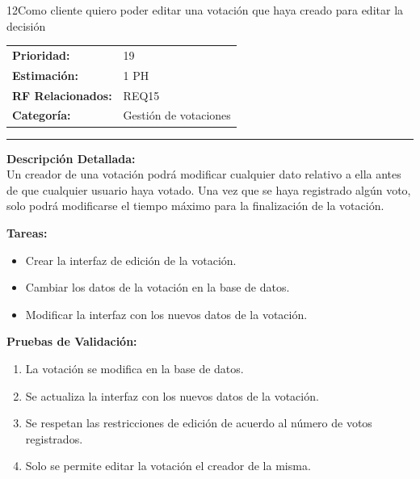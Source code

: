 \begin{hu_card}{12}{Como cliente quiero poder editar una votación que haya creado para editar la decisión}
    \begin{tabularx}{\linewidth}{l X}
        \textbf{Prioridad:}   & 19\\
        \textbf{Estimación:}  & 1 PH \\
        \textbf{RF Relacionados:} & REQ15 \\
        \textbf{Categoría:} & Gestión de votaciones \\
    \end{tabularx}

    \vspace{2mm}
    \hrule
    \vspace{2mm}

    \textbf{Descripción Detallada:} \\
    Un creador de una votación podrá modificar cualquier dato relativo a ella antes de que cualquier usuario haya votado. Una vez que se haya registrado algún voto, solo podrá modificarse el tiempo máximo para la finalización de la votación.

    \vspace{2mm}
    \textbf{Tareas:}
    \begin{itemize}[noitemsep, topsep=0pt]
        \item Crear la interfaz de edición de la votación.
        \item Cambiar los datos de la votación en la base de datos.
        \item Modificar la interfaz con los nuevos datos de la votación.
    \end{itemize}

    \vspace{2mm}
    \textbf{Pruebas de Validación:}
    \begin{enumerate}[noitemsep, topsep=0pt]
        \item La votación se modifica en la base de datos.
        \item Se actualiza la interfaz con los nuevos datos de la votación.
        \item Se respetan las restricciones de edición de acuerdo al número de votos registrados.
        \item Solo se permite editar la votación el creador de la misma.
    \end{enumerate}
\end{hu_card}

